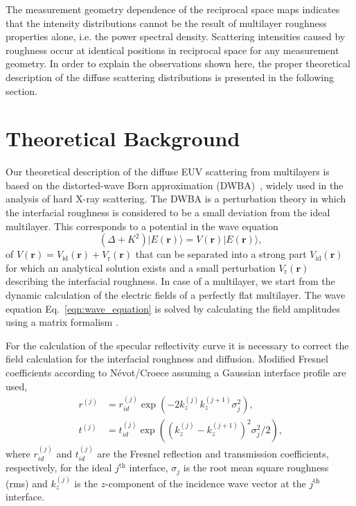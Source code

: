 The measurement geometry dependence of the reciprocal space maps indicates that the intensity distributions cannot be the result of multilayer roughness properties alone, i.e. the power spectral density. Scattering intensities caused by roughness occur at identical positions in reciprocal space for any measurement geometry. In order to explain the observations shown here, the proper theoretical description of the diffuse scattering distributions is presented in the following section.

\section{Theoretical Background} \label{sec:theory} Our theoretical description of the diffuse EUV scattering from multilayers is based on the distorted-wave Born approximation (DWBA)~\cite{PhysRevB.49.10668,PhysRevB.47.15896}, widely used in the analysis of hard X-ray scattering. The DWBA is a perturbation theory in which the interfacial roughness is considered to be a small deviation from the ideal multilayer. This corresponds to a potential in the wave equation 
\begin{equation}
        (\Delta + K^2) |E(\mathbf{r})\rangle = V(\mathbf{r}) |E(\mathbf{r})\rangle\text{,} \label{eqn:wave_equation} 
\end{equation}
of $V(\mathbf{r}) = V_\text{id}(\mathbf{r}) + V_\text{r}(\mathbf{r})$ that can be separated into a strong part $V_\text{id}(\mathbf{r})$ for which an analytical solution exists and a small perturbation $V_\text{r}(\mathbf{r})$ describing the interfacial roughness. In case of a multilayer, we start from the dynamic calculation of the electric fields of a perfectly flat multilayer. The wave equation Eq.~\eqref{eqn:wave_equation} is solved by calculating the field amplitudes using a matrix formalism \cite{PrinciplesOfOptics}.

For the calculation of the specular reflectivity curve it is necessary to correct the field calculation for the interfacial roughness and diffusion. Modified Fresnel coefficients according to N\'evot/Croece \cite{nevot_croece} assuming a Gaussian interface profile are used, 
\begin{align}
        r^{(j)} &= r_{id}^{(j)} \exp(-2 k_z^{(j)} k_z^{(j+1)} \sigma_j^2)\text{,} \label{eqn:fresnel_r}\\
        t^{(j)} &= t_{id}^{(j)} \exp((k_z^{(j)} - k_z^{(j+1)})^2 \sigma_j^2/2) \text{,} \label{eqn:fresnel_t}
\end{align}
where $r_{id}^{(j)}$ and $t_{id}^{(j)}$ are the Fresnel reflection and transmission coefficients, respectively, for the ideal  $j^\text{th}$ interface, $\sigma_j$ is the root mean square roughness (rms) and $k_z^{(j)}$ is the $z$-component of the incidence wave vector at the $j^\text{th}$ interface.

